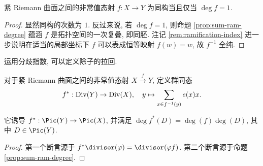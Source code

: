 \begin{proposition}\label{prop:degree-1}
	紧 Riemann 曲面之间的非常值态射 $f: X \to Y$ 为同构当且仅当 $\deg f = 1$.
\end{proposition}
\begin{proof}
	显然同构的次数为 $1$. 反过来说, 若 $\deg f = 1$, 则命题 \ref{prop:sum-ram-degree} 蕴涵 $f$ 是拓扑空间的一次复叠, 即同胚. 注记 \ref{rem:ramification-index} 进一步说明在适当的局部坐标下 $f$ 可以表成恒等映射 $f(w)=w$, 故 $f^{-1}$ 全纯.
\end{proof}

运用分歧指数, 可以定义除子的拉回.
\begin{definition-proposition}\label{def:divisor-pullback}
	对于紧 Riemann 曲面之间的非常值态射 $X \xrightarrow{f} Y$, 定义群同态
	\[ f^*: \operatorname{Div}(Y) \to \operatorname{Div}(X), \quad y \mapsto \sum_{x \in f^{-1}(y)} e(x) x. \]
	
	它诱导 $f^*: \Pic(Y) \to \Pic(X)$, 并满足 $\deg f^*(D) = \deg(f)\deg(D)$, 其中 $D \in \Pic(Y)$.
\end{definition-proposition}
\begin{proof}
	第一个断言源于 $f^* \divisor(\varphi) = \divisor(\varphi f)$. 第二个断言源于命题 \ref{prop:sum-ram-degree}.
\end{proof}

